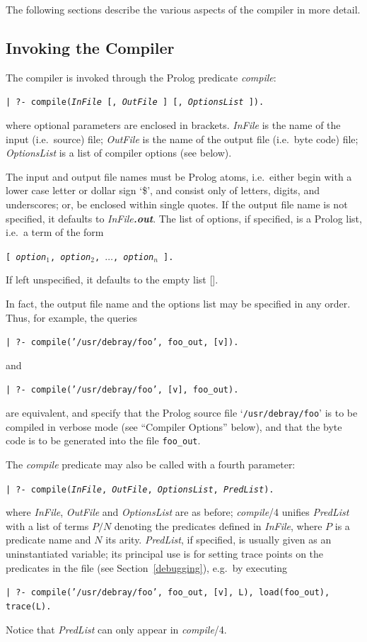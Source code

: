 The following sections describe the various aspects
of the compiler in more detail.

\subsection{Invoking the Compiler}

The compiler is invoked through the Prolog predicate {\em compile}:
\begin{center}
{\tt | ?- compile({\em InFile} [, {\em OutFile} ] [, {\em OptionsList} ]).}
\end{center}
where optional parameters are enclosed in brackets.
{\em InFile} is the name of the input (i.e.\ source) file;
{\em OutFile} is the name of the output file (i.e.\ byte code) file;
{\em OptionsList} is a list of compiler options (see below).

The input and output file names must be Prolog atoms,
i.e.\ either begin with a lower case letter or dollar sign `\$',
and consist only of letters, digits,
and underscores; or, be enclosed within single quotes.
If the output file name is not specified, it defaults to {\em InFile\bf .out}.
The list of options, if specified, is a Prolog list,
i.e.\ a term of the form
\begin{center}
{\tt [ {\em option}$_1$, {\em option}$_2$, $\ldots$, {\em option$_n$} ].}
\end{center}
If left unspecified, it defaults to the empty list [\/].

In fact, the output file name and the options list may be specified
in any order.
Thus, for example, the queries
\begin{center}
{\tt | ?- compile('/usr/debray/foo', foo\_out, [v]).}
\end{center}
and
\begin{center}
{\tt | ?- compile('/usr/debray/foo', [v], foo\_out).}
\end{center}
are equivalent, and specify that the Prolog source file
`{\tt /usr/debray/foo}' is to be compiled in verbose mode (see ``Compiler
Options'' below), and that the byte code is to be generated into the file
{\tt foo\_out}.

The {\em compile} predicate may also be called with a fourth parameter:
\begin{center}
{\tt | ?- compile({\em InFile}, {\em OutFile}, {\em OptionsList}, {\em PredList}).}
\end{center}
where {\em InFile}, {\em OutFile} and {\em OptionsList} are as before;
{\em compile}/4 unifies {\em PredList} with a list of terms $P/N$ denoting the
predicates defined in {\em InFile},
where $P$ is a predicate name and $N$ its arity.
{\em PredList}, if specified, is usually given as an uninstantiated variable;
its principal use is for setting trace points on the predicates in the file
(see Section~\ref{debugging}),
e.g.\ by executing
\begin{center}
{\tt | ?- compile('/usr/debray/foo', foo\_out, [v], L), load(foo\_out), trace(L).}
\end{center}
Notice that {\em PredList} can only appear in {\em compile}/4.

